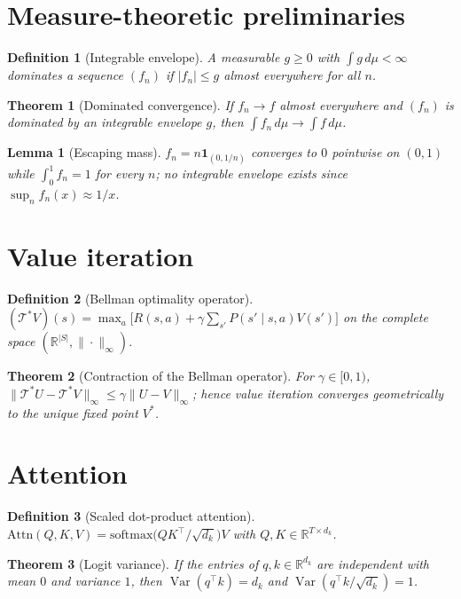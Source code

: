 \documentclass{article}
\newtheorem{theorem}{Theorem}
\newtheorem{definition}{Definition}
\newtheorem{lemma}{Lemma}
\begin{document}
\section{Measure-theoretic preliminaries}

\begin{definition}[Integrable envelope]
A measurable $g \ge 0$ with $\int g \, d\mu < \infty$ dominates a sequence $(f_n)$ if $|f_n| \le g$ almost everywhere for all $n$.
\end{definition}

\begin{theorem}[Dominated convergence]
If $f_n \to f$ almost everywhere and $(f_n)$ is dominated by an integrable envelope $g$, then $\int f_n \, d\mu \to \int f \, d\mu$.
\end{theorem}

\begin{lemma}[Escaping mass]
$f_n = n \mathbf{1}_{(0,1/n)}$ converges to $0$ pointwise on $(0,1)$ while $\int_0^1 f_n = 1$ for every $n$; no integrable envelope exists since $\sup_n f_n(x) \approx 1/x$.
\end{lemma}

\section{Value iteration}

\begin{definition}[Bellman optimality operator]
$(\mathcal{T}^* V)(s) = \max_a \big[ R(s,a) + \gamma \sum_{s'} P(s' \mid s,a) V(s') \big]$ on the complete space $(\mathbb{R}^{|S|}, \|\cdot\|_\infty)$.
\end{definition}

\begin{theorem}[Contraction of the Bellman operator]
For $\gamma \in [0,1)$, $\|\mathcal{T}^* U - \mathcal{T}^* V\|_\infty \le \gamma \|U - V\|_\infty$; hence value iteration converges geometrically to the unique fixed point $V^*$.
\end{theorem}

\section{Attention}

\begin{definition}[Scaled dot-product attention]
$\mathrm{Attn}(Q,K,V) = \mathrm{softmax}\!\big(QK^\top / \sqrt{d_k}\big) V$ with $Q, K \in \mathbb{R}^{T \times d_k}$.
\end{definition}

\begin{theorem}[Logit variance]
If the entries of $q, k \in \mathbb{R}^{d_k}$ are independent with mean $0$ and variance $1$, then $\operatorname{Var}(q^\top k) = d_k$ and $\operatorname{Var}(q^\top k / \sqrt{d_k}) = 1$.
\end{theorem}
\end{document}
